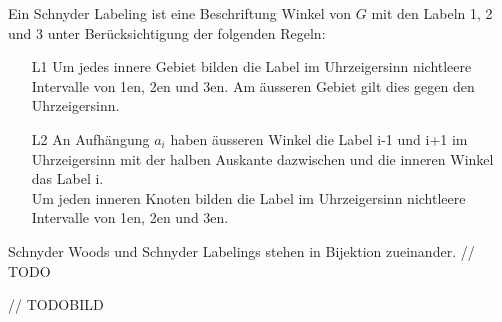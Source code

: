 \begin{definition}
Ein Schnyder Labeling ist eine Beschriftung Winkel von $G$ mit den Labeln 1, 2 und 3 unter Berücksichtigung der folgenden Regeln:
\begin{itemize}
\item[L1] Um jedes innere Gebiet bilden die Label im Uhrzeigersinn nichtleere Intervalle von 1en, 2en und 3en. Am äusseren Gebiet gilt dies gegen den Uhrzeigersinn.
\item[L2] An Aufhängung $a_i$ haben äusseren Winkel die Label i-1 und i+1 im Uhrzeigersinn mit der halben Auskante dazwischen und die inneren Winkel das Label i.\\
Um jeden inneren Knoten bilden die Label im Uhrzeigersinn nichtleere Intervalle von 1en, 2en und 3en.
\end{itemize} 

\end{definition}

\begin{theorem}
Schnyder Woods und Schnyder Labelings stehen in Bijektion zueinander.
// TODO  
\end{theorem}

// TODOBILD

\